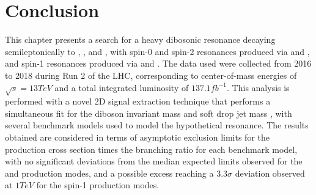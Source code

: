 
\section{Conclusion}
\label{sec:conclusion}

This chapter presents a search for a heavy dibosonic resonance decaying semileptonically to \WW, \WZ, and \WH, with spin-0 and spin-2 resonances produced via \ggF and \VBF, and spin-1 resonances produced via \DY and \VBF.
The data used were collected from 2016 to 2018 during Run 2 of the LHC, corresponding to center-of-mass energies of $\sqrt{s}=13\unit{TeV}$ and a total integrated luminosity of $137.1\unit{fb^{-1}}$.
This analysis is performed with a novel 2D signal extraction technique that performs a simultaneous fit for the diboson invariant mass \MVV and soft drop jet mass \MJ, with several benchmark models used to model the hypothetical resonance.
The results obtained are considered in terms of asymptotic exclusion limits for the production cross section times the branching ratio for each benchmark model, with no significant deviations from the median expected limits observed for the \ggF and \DY production modes, and a possible excess reaching a $3.3\sigma$ deviation observed at $1\unit{TeV}$ for the spin-1 \VBF production modes.
